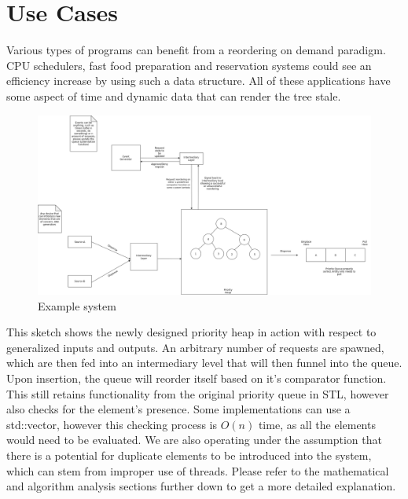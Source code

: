 \documentclass{article}
\begin{document}
\newpage

\section{Use Cases}

\begin{flushleft}

Various types of programs can benefit from a reordering on demand paradigm.
CPU schedulers, fast food preparation and reservation systems could see an efficiency increase by using such a data structure.
All of these applications have some aspect of time and dynamic data that can render the tree stale.

\begin{figure}[!h]
\centering
\includegraphics[width=15cm]{UseCaseSketch}
\caption{Example system}
\end{figure}

This sketch shows the newly designed priority heap in action with respect to generalized inputs and outputs.
An arbitrary number of requests are spawned, which are then fed into an intermediary level that will then funnel into the queue.
Upon insertion, the queue will reorder itself based on it's comparator function.
This still retains functionality from the original priority queue in STL, however also checks for the element's presence.
Some implementations can use a std::vector, however this checking process is $O(n)$ time, as all the elements would need to be evaluated.
We are also operating under the assumption that there is a potential for duplicate elements to be introduced into the system, which can stem from improper use of threads.
Please refer to the mathematical and algorithm analysis sections further down to get a more detailed explanation.

\end{flushleft}
\end{document}
